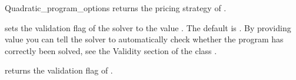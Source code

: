 \begin{ccRefClass}{Quadratic_program_options}
{returns the pricing strategy of \ccVar.}


{sets the validation flag of the solver to the value .
The default is . By providing value  you can
tell the solver to automatically check whether the program has
correctly been solved, see the Validity section of the class
.}

{returns the validation flag of \ccVar.}

\ccExample
{}

\ccSeeAlso

\\
\\
\\
\\
\end{ccRefClass}
